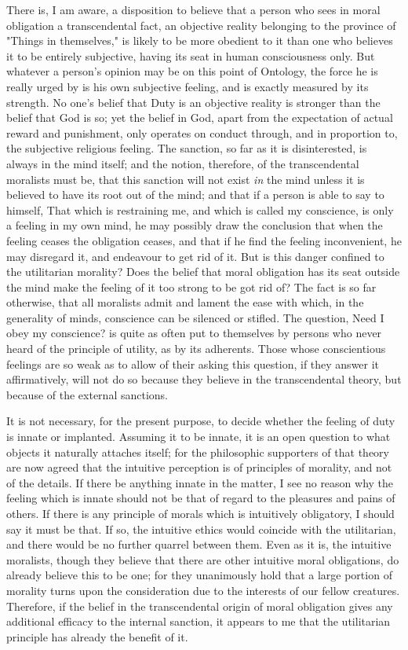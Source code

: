 \documentclass[12pt]{report}
\begin{document}
There is, I am aware, a disposition to believe that a person who sees in moral obligation a transcendental fact, an objective reality belonging to the province of "Things in themselves," is likely to be more obedient to it than one who believes it to be entirely subjective, having its seat in human consciousness only. But whatever a person's opinion may be on this point of Ontology, the force he is really urged by is his own subjective feeling, and is exactly measured by its strength. No one's belief that Duty is an objective reality is stronger than the belief that God is so; yet the belief in God, apart from the expectation of actual reward and punishment, only operates on conduct through, and in proportion to, the subjective religious feeling. The sanction, so far as it is disinterested, is always in the mind itself; and the notion, therefore, of the transcendental moralists must be, that this sanction will not exist \emph{in} the mind unless it is believed to have its root out of the mind; and that if a person is able to say to himself, That which is restraining me, and which is called my conscience, is only a feeling in my own mind, he may possibly draw the conclusion that when the feeling ceases the obligation ceases, and that if he find the feeling inconvenient, he may disregard it, and endeavour to get rid of it. But is this danger confined to the utilitarian morality? Does the belief that moral obligation has its seat outside the mind make the feeling of it too strong to be got rid of? The fact is so far otherwise, that all moralists admit and lament the ease with which, in the generality of minds, conscience can be silenced or stifled. The question, Need I obey my conscience? is quite as often put to themselves by persons who never heard of the principle of utility, as by its adherents. Those whose conscientious feelings are so weak as to allow of their asking this question, if they answer it affirmatively, will not do so because they believe in the transcendental theory, but because of the external sanctions.

It is not necessary, for the present purpose, to decide whether the feeling of duty is innate or implanted. Assuming it to be innate, it is an open question to what objects it naturally attaches itself; for the philosophic supporters of that theory are now agreed that the intuitive perception is of principles of morality, and not of the details. If there be anything innate in the matter, I see no reason why the feeling which is innate should not be that of regard to the pleasures and pains of others. If there is any principle of morals which is intuitively obligatory, I should say it must be that. If so, the intuitive ethics would coincide with the utilitarian, and there would be no further quarrel between them. Even as it is, the intuitive moralists, though they believe that there are other intuitive moral obligations, do already believe this to be one; for they unanimously hold that a large portion of morality turns upon the consideration due to the interests of our fellow creatures. Therefore, if the belief in the transcendental origin of moral obligation gives any additional efficacy to the internal sanction, it appears to me that the utilitarian principle has already the benefit of it.
\end{document}
